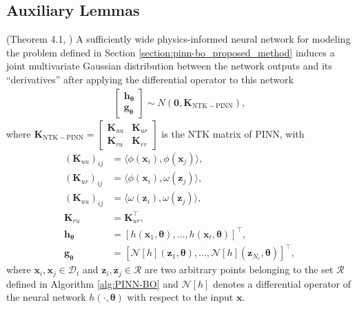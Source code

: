 \subsection{Auxiliary Lemmas}
\label{section:pinn-bo_aux_appendix}
\begin{auxlemma}{(Theorem 4.1, \citet{wang2022and})}
\label{lemma:PINN_GP}
A sufficiently wide physics-informed neural network for modeling the problem defined in Section \ref{section:pinn-bo_proposed_method} induces a joint multivariate
Gaussian distribution between the network outputs and its ``derivatives'' after applying the differential operator to this network
\begin{align*}
    \begin{bmatrix}
        \mathbf{h}_{\boldsymbol{\theta}} \\
        \mathbf{g}_{\boldsymbol{\theta}} 
\end{bmatrix} \sim N(\mathbf{0}, \mathbf{K}_\mathrm{NTK-PINN}),
\end{align*} 
where $\mathbf{K}_\mathrm{NTK-PINN} = \begin{bmatrix}
    \mathbf{K}_{uu} & \mathbf{K}_{ur} \\
    \mathbf{K}_{ru} & \mathbf{K}_{rr}
\end{bmatrix}$ is the NTK matrix of PINN, with
\begin{align*}
    (\mathbf{K}_{uu})_{ij} &= \langle \phi(\mathbf{x}_i), \phi(\mathbf{x}_j) \rangle, 
\\ 
    (\mathbf{K}_{ur})_{ij} &= \langle \phi(\mathbf{x}_i), \omega(\mathbf{z}_j) \rangle,
    \\
    (\mathbf{K}_{uu})_{ij} &= \langle \omega(\mathbf{z}_i), \omega(\mathbf{z}_j) \rangle,
    \\
    \mathbf{K}_{ru} &= \mathbf{K}_{ur}^\top, 
\\ 
    \mathbf{h}_{\boldsymbol{\theta}} &= [h(\mathbf{x}_1, \boldsymbol{\theta}), \dots, h(\mathbf{x}_t, \boldsymbol{\theta})]^\top,
    \\
    \mathbf{g}_{\boldsymbol{\theta}} &= \left[\mathcal{N}[h](\mathbf{z}_1, \boldsymbol{\theta}), \dots, \mathcal{N}[h](\mathbf{z}_{N_r}, \boldsymbol{\theta}) \right]^\top,
\end{align*}
where $\mathbf{x}_i, \mathbf{x}_j \in \mathcal{D}_t$ and $\mathbf{z}_i, \mathbf{z}_j \in \mathcal{R}$ are two arbitrary points belonging to the set $\mathcal{R}$ defined in Algorithm \ref{alg:PINN-BO} and $\mathcal{N}[h]$ denotes a differential operator of the neural network $h(\cdot, \boldsymbol{\theta})$ with respect to the input $\mathbf{x}$. 
\end{auxlemma}

